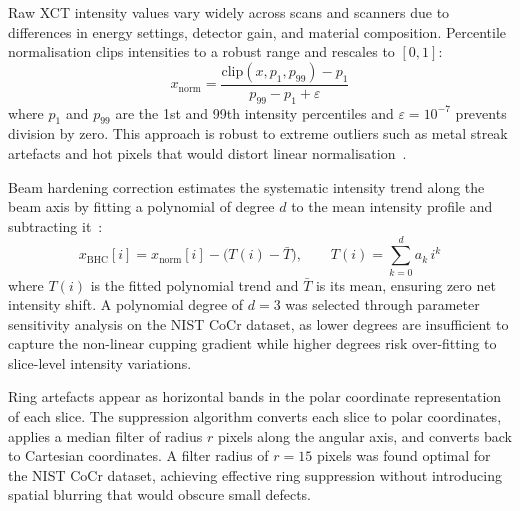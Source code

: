 Raw XCT intensity values vary widely across scans and scanners due to differences in energy settings,
detector gain, and material composition. Percentile normalisation clips intensities to a robust range
and rescales to $[0, 1]$:
\begin{equation}
x_{\mathrm{norm}} = \frac{\mathrm{clip}(x, p_1, p_{99}) - p_1}{p_{99} - p_1 + \varepsilon}
\label{eq:norm}
\end{equation}
where $p_1$ and $p_{99}$ are the 1st and 99th intensity percentiles and $\varepsilon = 10^{-7}$
prevents division by zero. This approach is robust to extreme outliers such as metal streak artefacts
and hot pixels that would distort linear normalisation~\citep{Bellens2021}.

Beam hardening correction estimates the systematic intensity trend along the beam axis by fitting a
polynomial of degree $d$ to the mean intensity profile and subtracting it~\citep{Miller2020}:
\begin{equation}
x_{\mathrm{BHC}}[i] = x_{\mathrm{norm}}[i] - \big(T(i) - \bar{T}\big),
\qquad T(i) = \sum_{k=0}^{d} a_k\, i^{k}
\label{eq:bhc}
\end{equation}
where $T(i)$ is the fitted polynomial trend and $\bar{T}$ is its mean, ensuring zero net intensity
shift. A polynomial degree of $d = 3$ was selected through parameter sensitivity analysis on the NIST
CoCr dataset, as lower degrees are insufficient to capture the non-linear cupping gradient while
higher degrees risk over-fitting to slice-level intensity variations.

Ring artefacts appear as horizontal bands in the polar coordinate representation of each slice. The
suppression algorithm converts each slice to polar coordinates, applies a median filter of radius $r$
pixels along the angular axis, and converts back to Cartesian coordinates. A filter radius of
$r = 15$ pixels was found optimal for the NIST CoCr dataset, achieving effective ring suppression
without introducing spatial blurring that would obscure small defects.

